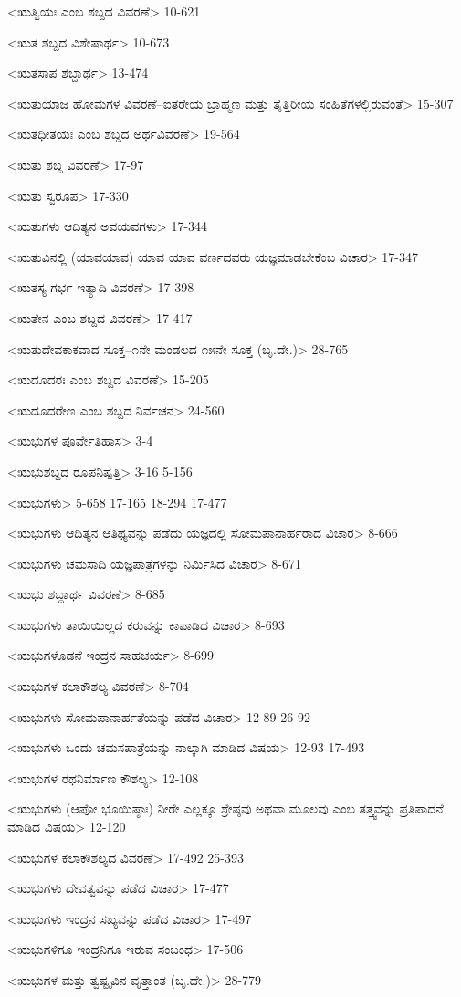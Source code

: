 <ಋತ್ವಿಯಃ ಎಂಬ ಶಬ್ದದ ವಿವರಣೆ>
10-621

<ಋತ ಶಬ್ದದ ವಿಶೇಷಾರ್ಥ>
10-673

<ಋತಸಾಪ ಶಬ್ದಾರ್ಥ>
13-474

<ಋತುಯಾಜ ಹೋಮಗಳ ವಿವರಣೆ–ಐತರೇಯ ಬ್ರಾಹ್ಮಣ ಮತ್ತು ತೈತ್ತಿರೀಯ ಸಂಹಿತೆಗಳಲ್ಲಿರುವಂತೆ>
15-307

<ಋತಧೀತಯಃ ಎಂಬ ಶಬ್ದದ ಅರ್ಥವಿವರಣೆ>
19-564

<ಋತು ಶಬ್ದ ವಿವರಣೆ>
17-97

<ಋತು ಸ್ವರೂಪ>
17-330

<ಋತುಗಳು ಆದಿತ್ಯನ ಅವಯವಗಳು>
17-344

<ಋತುವಿನಲ್ಲಿ (ಯಾವಯಾವ) ಯಾವ ಯಾವ ವರ್ಣದವರು ಯಜ್ಞಮಾಡಬೇಕೆಂಬ ವಿಚಾರ>
17-347

<ಋತಸ್ಯ ಗರ್ಭ ಇತ್ಯಾದಿ ವಿವರಣೆ>
17-398

<ಋತೇನ ಎಂಬ ಶಬ್ದದ ವಿವರಣೆ>
17-417

<ಋತುದೇವಕಾಕವಾದ ಸೂಕ್ತ–೧ನೇ ಮಂಡಲದ ೧೫ನೇ ಸೂಕ್ತ (ಬೃ.ದೇ.)>
28-765

<ಋದೂದರಃ ಎಂಬ ಶಬ್ದದ ವಿವರಣೆ>
15-205

<ಋದೂದರೇಣ ಎಂಬ ಶಬ್ದದ ನಿರ್ವಚನ>
24-560

<ಋಭುಗಳ ಪೂರ್ವೇತಿಹಾಸ>
3-4

<ಋಭುಶಬ್ದದ ರೂಪನಿಷ್ಪತ್ತಿ>
3-16
5-156

<ಋಭುಗಳು>
5-658 
17-165
18-294 
17-477

<ಋಭುಗಳು ಆದಿತ್ಯನ ಆತಿಥ್ಯವನ್ನು ಪಡೆದು ಯಜ್ಞದಲ್ಲಿ ಸೋಮಪಾನಾರ್ಹರಾದ ವಿಚಾರ>
8-666

<ಋಭುಗಳು ಚಮಸಾದಿ ಯಜ್ಞಪಾತ್ರೆಗಳನ್ನು ನಿರ್ಮಿಸಿದ ವಿಚಾರ>
8-671

<ಋಭು ಶಬ್ದಾರ್ಥ ವಿವರಣೆ>
8-685

<ಋಭುಗಳು ತಾಯಿಯಿಲ್ಲದ ಕರುವನ್ನು ಕಾಪಾಡಿದ ವಿಚಾರ>
8-693

<ಋಭುಗಳೊಡನೆ ಇಂದ್ರನ ಸಾಹಚರ್ಯ>
8-699

<ಋಭುಗಳ ಕಲಾಕೌಶಲ್ಯ ವಿವರಣೆ>
8-704

<ಋಭುಗಳು ಸೋಮಪಾನಾರ್ಹತೆಯನ್ನು ಪಡೆದ ವಿಚಾರ>
12-89 
26-92

<ಋಭುಗಳು ಒಂದು ಚಮಸಪಾತ್ರೆಯನ್ನು ನಾಲ್ಕಾಗಿ ಮಾಡಿದ ವಿಷಯ>
12-93 
17-493


<ಋಭುಗಳ ರಥನಿರ್ಮಾಣ ಕೌಶಲ್ಯ>
12-108

<ಋಭುಗಳು (ಆಪೋ ಭೂಯಿಷ್ಠಾಃ) ನೀರೇ ಎಲ್ಲಕ್ಕೂ ಶ್ರೇಷ್ಠವು ಅಥವಾ ಮೂಲವು ಎಂಬ ತತ್ತ್ವವನ್ನು ಪ್ರತಿಪಾದನೆ ಮಾಡಿದ ವಿಷಯ>
12-120

<ಋಭುಗಳ ಕಲಾಕೌಶಲ್ಯದ ವಿವರಣೆ>
17-492
25-393

<ಋಭುಗಳು ದೇವತ್ವವನ್ನು ಪಡೆದ ವಿಚಾರ>
17-477

<ಋಭುಗಳು ಇಂದ್ರನ ಸಖ್ಯವನ್ನು ಪಡೆದ ವಿಚಾರ>
17-497

<ಋಭುಗಳಿಗೂ ಇಂದ್ರನಿಗೂ ಇರುವ ಸಂಬಂಧ>
17-506

<ಋಭುಗಳ ಮತ್ತು ತ್ವಷ್ಟೃವಿನ ವೃತ್ತಾಂತ (ಬೃ.ದೇ.)>
28-779

